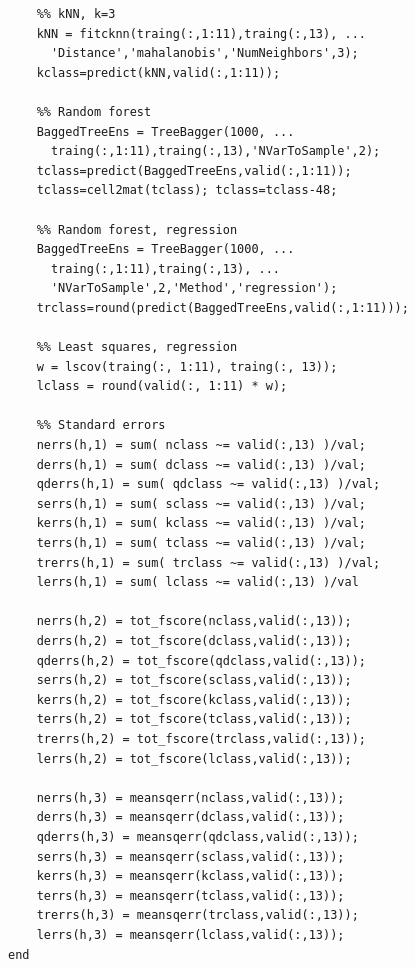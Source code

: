 \documentclass[twoside]{article}
\begin{document}
\begin{multicols}{2}
{\begin{verbatim}
    %% kNN, k=3
    kNN = fitcknn(traing(:,1:11),traing(:,13), ...
      'Distance','mahalanobis','NumNeighbors',3);
    kclass=predict(kNN,valid(:,1:11));

    %% Random forest
    BaggedTreeEns = TreeBagger(1000, ...
      traing(:,1:11),traing(:,13),'NVarToSample',2);
    tclass=predict(BaggedTreeEns,valid(:,1:11));
    tclass=cell2mat(tclass); tclass=tclass-48;

    %% Random forest, regression
    BaggedTreeEns = TreeBagger(1000, ...
      traing(:,1:11),traing(:,13), ...
      'NVarToSample',2,'Method','regression');    
    trclass=round(predict(BaggedTreeEns,valid(:,1:11)));
        
    %% Least squares, regression
    w = lscov(traing(:, 1:11), traing(:, 13));
    lclass = round(valid(:, 1:11) * w);

    %% Standard errors
    nerrs(h,1) = sum( nclass ~= valid(:,13) )/val;
    derrs(h,1) = sum( dclass ~= valid(:,13) )/val;
    qderrs(h,1) = sum( qdclass ~= valid(:,13) )/val;
    serrs(h,1) = sum( sclass ~= valid(:,13) )/val;
    kerrs(h,1) = sum( kclass ~= valid(:,13) )/val;
    terrs(h,1) = sum( tclass ~= valid(:,13) )/val;
    trerrs(h,1) = sum( trclass ~= valid(:,13) )/val;
    lerrs(h,1) = sum( lclass ~= valid(:,13) )/val

    nerrs(h,2) = tot_fscore(nclass,valid(:,13));
    derrs(h,2) = tot_fscore(dclass,valid(:,13));
    qderrs(h,2) = tot_fscore(qdclass,valid(:,13));
    serrs(h,2) = tot_fscore(sclass,valid(:,13));
    kerrs(h,2) = tot_fscore(kclass,valid(:,13));
    terrs(h,2) = tot_fscore(tclass,valid(:,13));
    trerrs(h,2) = tot_fscore(trclass,valid(:,13));
    lerrs(h,2) = tot_fscore(lclass,valid(:,13));

    nerrs(h,3) = meansqerr(nclass,valid(:,13));
    derrs(h,3) = meansqerr(dclass,valid(:,13));
    qderrs(h,3) = meansqerr(qdclass,valid(:,13));
    serrs(h,3) = meansqerr(sclass,valid(:,13));
    kerrs(h,3) = meansqerr(kclass,valid(:,13));
    terrs(h,3) = meansqerr(tclass,valid(:,13));
    trerrs(h,3) = meansqerr(trclass,valid(:,13));
    lerrs(h,3) = meansqerr(lclass,valid(:,13));
end

\end{verbatim}

}

\end{multicols}
\end{document}
